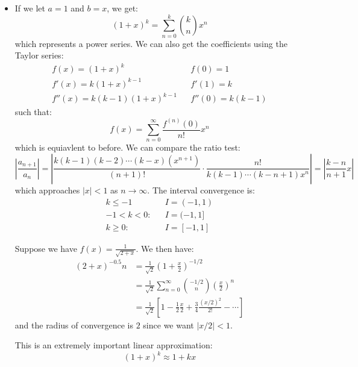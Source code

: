 \begin{itemize}
    \item If we let $a=1$ and $b=x$, we get:
    \begin{equation}
        (1+x)^k = \sum_{n=0}^k \binom{k}{n}x^n
    \end{equation}
    which represents a power series. We can also get the coefficients using the Taylor series:
    \begin{align}
        f(x)=(1+x)^k && f(0)=1 \\ 
        f'(x)=k(1+x)^{k-1} && f'(1) = k \\ 
        f''(x)=k(k-1)(1+x)^{k-1} && f''(0) = k(k-1)
    \end{align}
    such that:
    \begin{equation}
        f(x) = \sum_{n=0}^\infty \frac{f^{(n)}(0)}{n!}x^n
    \end{equation}
    which is equiavlent to before. We can compare the ratio test:
    \begin{equation}
        \left|\frac{a_{n+1}}{a_n}\right| = \left|\frac{k(k-1)(k-2)\cdots (k-x)(x^{n+1})}{(n+1)!}\cdot \frac{n!}{k(k-1)\cdots (k-n+1)x^n}\right| = \left|\frac{k-n}{n+1}x\right|
    \end{equation}
    which approaches $|x|<1$ as $n\to \infty$. The interval convergence is:
    \begin{align}
        k \le -1 && I = (-1,1) \\ 
        -1<k<0: && I= (-1,1] \\ 
        k \ge 0: && I = [-1,1]
    \end{align}
    \begin{example}
        Suppose we have $f(x)=\frac{1}{\sqrt{2+x}}$. We then have:
        \begin{align}
            (2+x)^{-0.5}{n} &= \frac{1}{\sqrt{2}}\left(1+\frac{x}{2}\right)^{-1/2} \\ 
            &= \frac{1}{\sqrt{2}}\sum_{n=0}^\infty \binom{-1/2}{n}\left(\frac{x}{2}{}\right)^n \\ 
            &= \frac{1}{\sqrt{2}}\left[1-\frac{1}{2}\frac{x}{2}+\frac{3}{4}\frac{(x/2)^2}{2!}-\cdots\right]
        \end{align}
        and the radius of convergence is $2$ since we want $|x/2|<1$.
    \end{example}
    \begin{example}
        This is an extremely important linear approximation:
        \begin{equation}
            (1+x)^k \approx 1+kx
        \end{equation}
    \end{example}
\end{itemize}